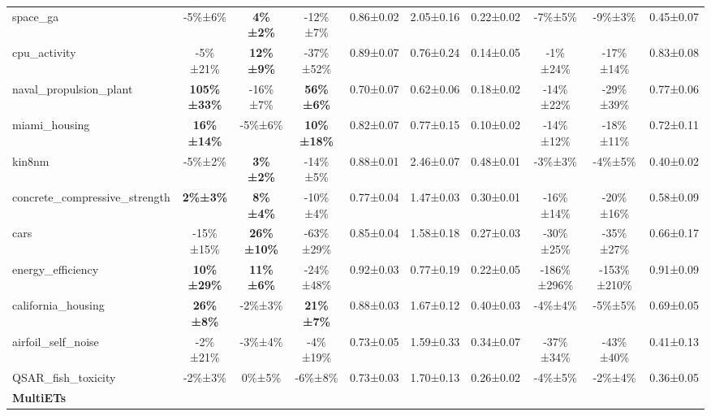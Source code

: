\begin{table}[!htbp]
\begin{small}
\begin{sc}
{\begin{tabular}{lccccccccc}
space\_ga & -5\%±6\% & \textbf{4\%±2\%} & -12\%±7\% & 0.86±0.02 & 2.05±0.16 & 0.22±0.02 & -7\%±5\% & -9\%±3\% & 0.45±0.07 \\
cpu\_activity & -5\%±21\% & \textbf{12\%±9\%} & -37\%±52\% & 0.89±0.07 & 0.76±0.24 & 0.14±0.05 & -1\%±24\% & -17\%±14\% & 0.83±0.08 \\
naval\_propulsion\_plant & \textbf{105\%±33\%} & -16\%±7\% & \textbf{56\%±6\%} & 0.70±0.07 & 0.62±0.06 & 0.18±0.02 & -14\%±22\% & -29\%±39\% & 0.77±0.06 \\
miami\_housing & \textbf{16\%±14\%} & -5\%±6\% & \textbf{10\%±18\%} & 0.82±0.07 & 0.77±0.15 & 0.10±0.02 & -14\%±12\% & -18\%±11\% & 0.72±0.11 \\
kin8nm & -5\%±2\% & \textbf{3\%±2\%} & -14\%±5\% & 0.88±0.01 & 2.46±0.07 & 0.48±0.01 & -3\%±3\% & -4\%±5\% & 0.40±0.02 \\
concrete\_compressive\_strength & \textbf{2\%±3\%} & \textbf{8\%±4\%} & -10\%±4\% & 0.77±0.04 & 1.47±0.03 & 0.30±0.01 & -16\%±14\% & -20\%±16\% & 0.58±0.09 \\
cars & -15\%±15\% & \textbf{26\%±10\%} & -63\%±29\% & 0.85±0.04 & 1.58±0.18 & 0.27±0.03 & -30\%±25\% & -35\%±27\% & 0.66±0.17 \\
energy\_efficiency & \textbf{10\%±29\%} & \textbf{11\%±6\%} & -24\%±48\% & 0.92±0.03 & 0.77±0.19 & 0.22±0.05 & -186\%±296\% & -153\%±210\% & 0.91±0.09 \\
california\_housing & \textbf{26\%±8\%} & -2\%±3\% & \textbf{21\%±7\%} & 0.88±0.03 & 1.67±0.12 & 0.40±0.03 & -4\%±4\% & -5\%±5\% & 0.69±0.05 \\
airfoil\_self\_noise & -2\%±21\% & -3\%±4\% & -4\%±19\% & 0.73±0.05 & 1.59±0.33 & 0.34±0.07 & -37\%±34\% & -43\%±40\% & 0.41±0.13 \\
QSAR\_fish\_toxicity & -2\%±3\% & 0\%±5\% & -6\%±8\% & 0.73±0.03 & 1.70±0.13 & 0.26±0.02 & -4\%±5\% & -2\%±4\% & 0.36±0.05 \\
\cmidrule(lr){1-10}
\textbf{MultiETs} & & & & & & & & & \\ \cmidrule(lr){1-10}


\end{tabular}}
\end{sc}
\end{small}
\end{table}
